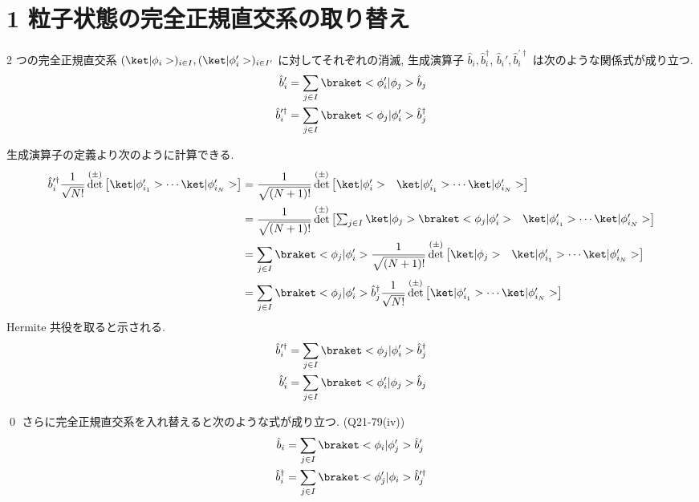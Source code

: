 \documentclass[uplatex,dvipdfmx,a4paper,11pt]{jlreq}
\makeatletter
\DeclareMathOperator{\Det}{det}
\numberwithin{equation}{section}
\theoremstyle{definition}
\renewenvironment{proof}[1][\proofname]{\par
  \normalfont
  \topsep6\p@\@plus6\p@ \trivlist
  \item[\hskip\labelsep{\bfseries #1}\@addpunct{\bfseries}]\ignorespaces\quad\par
}{
  \qed\endtrivlist\@endpefalse
}
\renewcommand\proofname{証明}
\makeatother
\begin{document}
\section{1 粒子状態の完全正規直交系の取り替え}
\begin{theorem}[Q21-79(i)(ii)(iii)]
  2 つの完全正規直交系 $(\ket|\phi_i>)_{i\in I}, (\ket|\phi_i'>)_{i\in I'}$ に対してそれぞれの消滅, 生成演算子 $\hat{b}_i, \hat{b}_i^\dagger$, $\hat{b}_i', \hat{b}_i^{\prime\dagger}$ は次のような関係式が成り立つ.
  \begin{align}
    \hat{b}_i'                & = \sum_{j\in I}\braket<\phi_i'|\phi_j>\hat{b}_j         \\
    \hat{b}_i^{\prime\dagger} & = \sum_{j\in I}\braket<\phi_j|\phi_i'>\hat{b}_j^\dagger
  \end{align}
\end{theorem}
\begin{proof}
  生成演算子の定義より次のように計算できる.
  \begin{align}
    \hat{b}_i^{\prime\dagger}\frac{1}{\sqrt{N!}}\Det^{(\pm)}\begin{bmatrix}\ket|\phi_{i_1}'>\cdots\ket|\phi_{i_N}'>\end{bmatrix}
     & = \frac{1}{\sqrt{(N+1)!}}\Det^{(\pm)}\begin{bmatrix}\ket|\phi_i'> & \ket|\phi_{i_1}'>\cdots\ket|\phi_{i_N}'>\end{bmatrix}                                    \\
     & = \frac{1}{\sqrt{(N+1)!}}\Det^{(\pm)}\begin{bmatrix}\sum_{j\in I}\ket|\phi_j>\braket<\phi_j|\phi_i'> & \ket|\phi_{i_1}'>\cdots\ket|\phi_{i_N}'>\end{bmatrix} \\
     & = \sum_{j\in I}\braket<\phi_j|\phi_i'>\frac{1}{\sqrt{(N+1)!}}\Det^{(\pm)}\begin{bmatrix}\ket|\phi_j> & \ket|\phi_{i_1}'>\cdots\ket|\phi_{i_N}'>\end{bmatrix} \\
     & = \sum_{j\in I}\braket<\phi_j|\phi_i'>\hat{b}_j^\dagger\frac{1}{\sqrt{N!}}\Det^{(\pm)}\begin{bmatrix}\ket|\phi_{i_1}'>\cdots\ket|\phi_{i_N}'>\end{bmatrix}
  \end{align}
  Hermite 共役を取ると示される.
  \begin{align}
    \hat{b}_i^{\prime\dagger} & = \sum_{j\in I}\braket<\phi_j|\phi_i'>\hat{b}_j^\dagger \\
    \hat{b}_i^{\prime}        & = \sum_{j\in I}\braket<\phi_i'|\phi_j>\hat{b}_j
  \end{align}
\end{proof}
さらに完全正規直交系を入れ替えると次のような式が成り立つ. (Q21-79(iv))
\begin{align}
  \hat{b}_i         & = \sum_{j\in I}\braket<\phi_i|\phi_j'>\hat{b}_j'                \\
  \hat{b}_i^\dagger & = \sum_{j\in I}\braket<\phi_j'|\phi_i>\hat{b}_j^{\prime\dagger}
\end{align}
\end{document}
